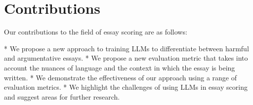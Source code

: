 \documentclass{article}
\begin{document}
\section{Contributions}

Our contributions to the field of essay scoring are as follows:

* We propose a new approach to training LLMs to differentiate between harmful and argumentative essays.
* We propose a new evaluation metric that takes into account the nuances of language and the context in which the essay is being written.
* We demonstrate the effectiveness of our approach using a range of evaluation metrics.
* We highlight the challenges of using LLMs in essay scoring and suggest areas for further research.
\end{document}
